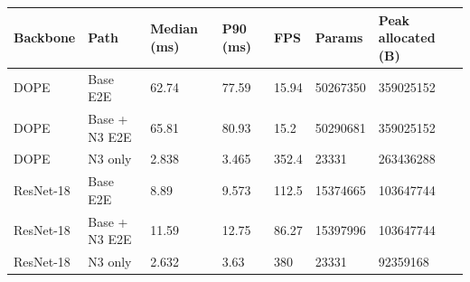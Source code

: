 \begin{tabular}{lllllll}
\hline
Backbone & Path & Median (ms) & P90 (ms) & FPS & Params & Peak allocated (B) \\
\hline
DOPE & Base E2E & 62.74 & 77.59 & 15.94 & 50267350 & 359025152 \\
DOPE & Base + N3 E2E & 65.81 & 80.93 & 15.2 & 50290681 & 359025152 \\
DOPE & N3 only & 2.838 & 3.465 & 352.4 & 23331 & 263436288 \\
ResNet-18 & Base E2E & 8.89 & 9.573 & 112.5 & 15374665 & 103647744 \\
ResNet-18 & Base + N3 E2E & 11.59 & 12.75 & 86.27 & 15397996 & 103647744 \\
ResNet-18 & N3 only & 2.632 & 3.63 & 380 & 23331 & 92359168 \\
\hline
\end{tabular}
